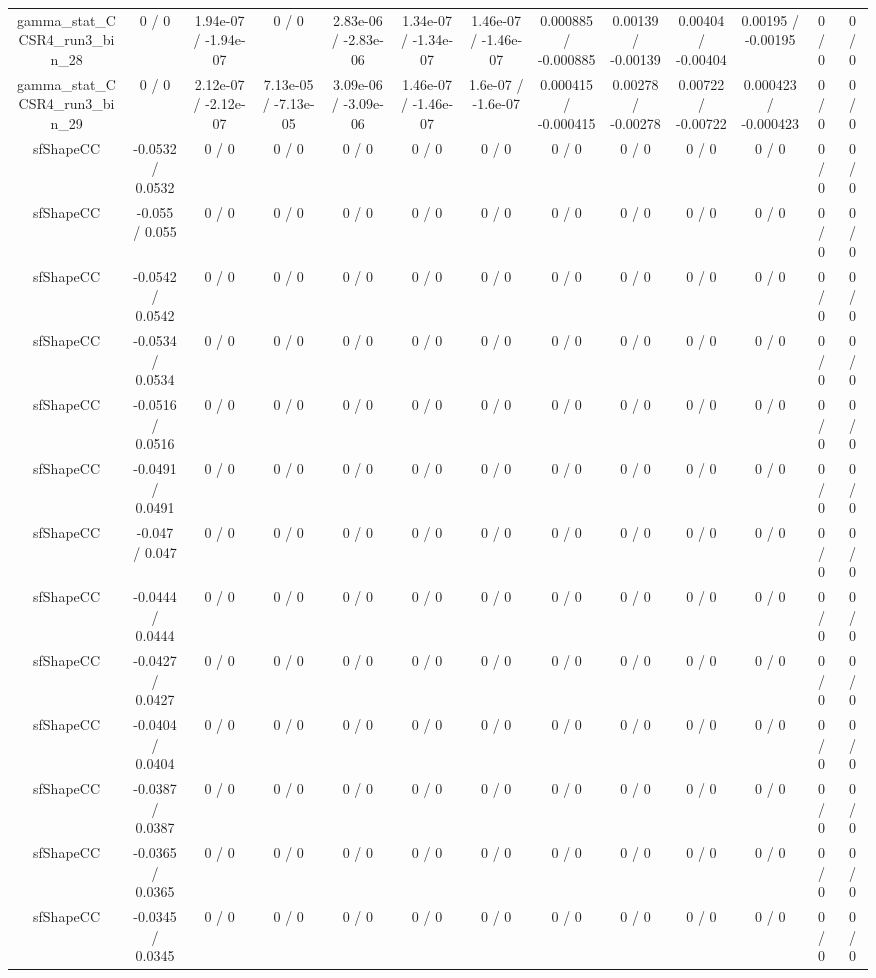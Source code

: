 \documentclass[10pt]{article}
\begin{document}
\begin{table}[htbp]
\begin{center}
\begin{tabular}{|c|c|c|c|c|c|c|c|c|c|c|c|c|}
  gamma_stat_CCSR4_run3_bin_28 & 0 / 0 & 1.94e-07 / -1.94e-07 & 0 / 0 & 2.83e-06 / -2.83e-06 & 1.34e-07 / -1.34e-07 & 1.46e-07 / -1.46e-07 & 0.000885 / -0.000885 & 0.00139 / -0.00139 & 0.00404 / -0.00404 & 0.00195 / -0.00195 & 0 / 0 & 0 / 0 \\ 
  gamma_stat_CCSR4_run3_bin_29 & 0 / 0 & 2.12e-07 / -2.12e-07 & 7.13e-05 / -7.13e-05 & 3.09e-06 / -3.09e-06 & 1.46e-07 / -1.46e-07 & 1.6e-07 / -1.6e-07 & 0.000415 / -0.000415 & 0.00278 / -0.00278 & 0.00722 / -0.00722 & 0.000423 / -0.000423 & 0 / 0 & 0 / 0 \\ 
  sfShapeCC & -0.0532 / 0.0532 & 0 / 0 & 0 / 0 & 0 / 0 & 0 / 0 & 0 / 0 & 0 / 0 & 0 / 0 & 0 / 0 & 0 / 0 & 0 / 0 & 0 / 0 \\ 
  sfShapeCC & -0.055 / 0.055 & 0 / 0 & 0 / 0 & 0 / 0 & 0 / 0 & 0 / 0 & 0 / 0 & 0 / 0 & 0 / 0 & 0 / 0 & 0 / 0 & 0 / 0 \\ 
  sfShapeCC & -0.0542 / 0.0542 & 0 / 0 & 0 / 0 & 0 / 0 & 0 / 0 & 0 / 0 & 0 / 0 & 0 / 0 & 0 / 0 & 0 / 0 & 0 / 0 & 0 / 0 \\ 
  sfShapeCC & -0.0534 / 0.0534 & 0 / 0 & 0 / 0 & 0 / 0 & 0 / 0 & 0 / 0 & 0 / 0 & 0 / 0 & 0 / 0 & 0 / 0 & 0 / 0 & 0 / 0 \\ 
  sfShapeCC & -0.0516 / 0.0516 & 0 / 0 & 0 / 0 & 0 / 0 & 0 / 0 & 0 / 0 & 0 / 0 & 0 / 0 & 0 / 0 & 0 / 0 & 0 / 0 & 0 / 0 \\ 
  sfShapeCC & -0.0491 / 0.0491 & 0 / 0 & 0 / 0 & 0 / 0 & 0 / 0 & 0 / 0 & 0 / 0 & 0 / 0 & 0 / 0 & 0 / 0 & 0 / 0 & 0 / 0 \\ 
  sfShapeCC & -0.047 / 0.047 & 0 / 0 & 0 / 0 & 0 / 0 & 0 / 0 & 0 / 0 & 0 / 0 & 0 / 0 & 0 / 0 & 0 / 0 & 0 / 0 & 0 / 0 \\ 
  sfShapeCC & -0.0444 / 0.0444 & 0 / 0 & 0 / 0 & 0 / 0 & 0 / 0 & 0 / 0 & 0 / 0 & 0 / 0 & 0 / 0 & 0 / 0 & 0 / 0 & 0 / 0 \\ 
  sfShapeCC & -0.0427 / 0.0427 & 0 / 0 & 0 / 0 & 0 / 0 & 0 / 0 & 0 / 0 & 0 / 0 & 0 / 0 & 0 / 0 & 0 / 0 & 0 / 0 & 0 / 0 \\ 
  sfShapeCC & -0.0404 / 0.0404 & 0 / 0 & 0 / 0 & 0 / 0 & 0 / 0 & 0 / 0 & 0 / 0 & 0 / 0 & 0 / 0 & 0 / 0 & 0 / 0 & 0 / 0 \\ 
  sfShapeCC & -0.0387 / 0.0387 & 0 / 0 & 0 / 0 & 0 / 0 & 0 / 0 & 0 / 0 & 0 / 0 & 0 / 0 & 0 / 0 & 0 / 0 & 0 / 0 & 0 / 0 \\ 
  sfShapeCC & -0.0365 / 0.0365 & 0 / 0 & 0 / 0 & 0 / 0 & 0 / 0 & 0 / 0 & 0 / 0 & 0 / 0 & 0 / 0 & 0 / 0 & 0 / 0 & 0 / 0 \\ 
  sfShapeCC & -0.0345 / 0.0345 & 0 / 0 & 0 / 0 & 0 / 0 & 0 / 0 & 0 / 0 & 0 / 0 & 0 / 0 & 0 / 0 & 0 / 0 & 0 / 0 & 0 / 0 \\ 

\end{tabular}
\end{center}
\end{table}
\end{document}
